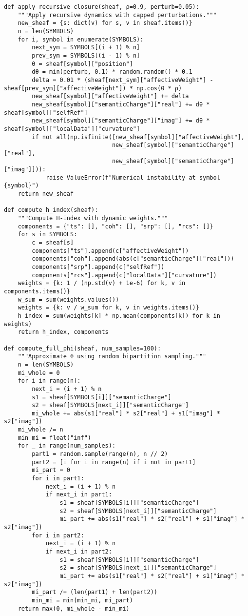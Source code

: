 \documentclass[11pt]{article}
\begin{document}
\begin{lstlisting}
def apply_recursive_closure(sheaf, ρ=0.9, perturb=0.05):
    """Apply recursive dynamics with capped perturbations."""
    new_sheaf = {s: dict(v) for s, v in sheaf.items()}
    n = len(SYMBOLS)
    for i, symbol in enumerate(SYMBOLS):
        next_sym = SYMBOLS[(i + 1) % n]
        prev_sym = SYMBOLS[(i - 1) % n]
        θ = sheaf[symbol]["position"]
        dθ = min(perturb, 0.1) * random.random() * 0.1
        delta = 0.01 * (sheaf[next_sym]["affectiveWeight"] - sheaf[prev_sym]["affectiveWeight"]) * np.cos(θ * ρ)
        new_sheaf[symbol]["affectiveWeight"] += delta
        new_sheaf[symbol]["semanticCharge"]["real"] += dθ * sheaf[symbol]["selfRef"]
        new_sheaf[symbol]["semanticCharge"]["imag"] += dθ * sheaf[symbol]["localData"]["curvature"]
        if not all(np.isfinite([new_sheaf[symbol]["affectiveWeight"],
                               new_sheaf[symbol]["semanticCharge"]["real"],
                               new_sheaf[symbol]["semanticCharge"]["imag"]])):
            raise ValueError(f"Numerical instability at symbol {symbol}")
    return new_sheaf

def compute_h_index(sheaf):
    """Compute H-index with dynamic weights."""
    components = {"ts": [], "coh": [], "srp": [], "rcs": []}
    for s in SYMBOLS:
        c = sheaf[s]
        components["ts"].append(c["affectiveWeight"])
        components["coh"].append(abs(c["semanticCharge"]["real"]))
        components["srp"].append(c["selfRef"])
        components["rcs"].append(c["localData"]["curvature"])
    weights = {k: 1 / (np.std(v) + 1e-6) for k, v in components.items()}
    w_sum = sum(weights.values())
    weights = {k: v / w_sum for k, v in weights.items()}
    h_index = sum(weights[k] * np.mean(components[k]) for k in weights)
    return h_index, components

def compute_full_phi(sheaf, num_samples=100):
    """Approximate Φ using random bipartition sampling."""
    n = len(SYMBOLS)
    mi_whole = 0
    for i in range(n):
        next_i = (i + 1) % n
        s1 = sheaf[SYMBOLS[i]]["semanticCharge"]
        s2 = sheaf[SYMBOLS[next_i]]["semanticCharge"]
        mi_whole += abs(s1["real"] * s2["real"] + s1["imag"] * s2["imag"])
    mi_whole /= n
    min_mi = float("inf")
    for _ in range(num_samples):
        part1 = random.sample(range(n), n // 2)
        part2 = [i for i in range(n) if i not in part1]
        mi_part = 0
        for i in part1:
            next_i = (i + 1) % n
            if next_i in part1:
                s1 = sheaf[SYMBOLS[i]]["semanticCharge"]
                s2 = sheaf[SYMBOLS[next_i]]["semanticCharge"]
                mi_part += abs(s1["real"] * s2["real"] + s1["imag"] * s2["imag"])
        for i in part2:
            next_i = (i + 1) % n
            if next_i in part2:
                s1 = sheaf[SYMBOLS[i]]["semanticCharge"]
                s2 = sheaf[SYMBOLS[next_i]]["semanticCharge"]
                mi_part += abs(s1["real"] * s2["real"] + s1["imag"] * s2["imag"])
        mi_part /= (len(part1) + len(part2))
        min_mi = min(min_mi, mi_part)
    return max(0, mi_whole - min_mi)


\end{lstlisting}
\end{document}
